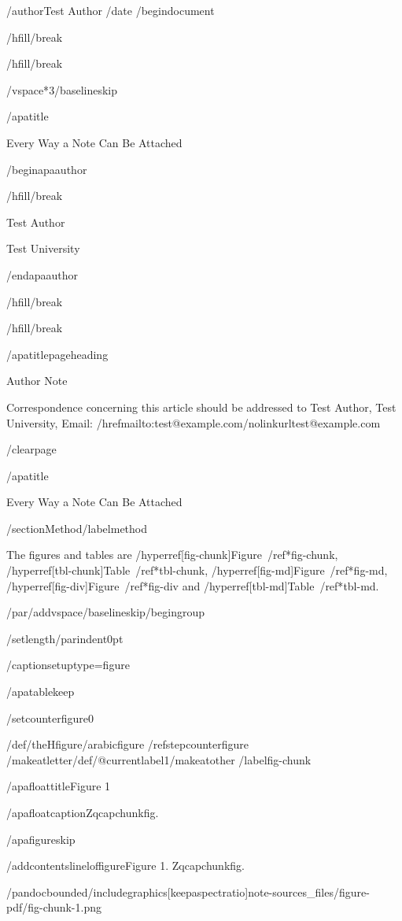 /author{Test Author}
/date{}
/begin{document}


/hfill/break

/hfill/break

/vspace*{3/baselineskip}

/apatitle{

Every Way a Note Can Be Attached

}

/begin{apaauthor}

/hfill/break

Test Author

Test University

/end{apaauthor}

/hfill/break

/hfill/break

/apatitlepageheading{

Author Note

}

Correspondence concerning this article should be addressed to Test
Author, Test University, Email:
/href{mailto:test@example.com}{/nolinkurl{test@example.com}}

/clearpage

/apatitle{

Every Way a Note Can Be Attached

}

/section{Method}/label{method}

The figures and tables are
/hyperref[fig-chunk]{Figure~/ref*{fig-chunk}},
/hyperref[tbl-chunk]{Table~/ref*{tbl-chunk}},
/hyperref[fig-md]{Figure~/ref*{fig-md}},
/hyperref[fig-div]{Figure~/ref*{fig-div}} and
/hyperref[tbl-md]{Table~/ref*{tbl-md}}.

/par/addvspace{/baselineskip}/begingroup

/setlength{/parindent}{0pt}

/captionsetup{type=figure}

/apatablekeep

/setcounter{figure}{0}

/def/theHfigure{/arabic{figure}}%
/refstepcounter{figure}%
/makeatletter/def/@currentlabel{1}/makeatother%
/label{fig-chunk}

/apafloattitle{Figure 1}

/apafloatcaption{Zqcapchunkfig.}

/apafigureskip

/addcontentsline{lof}{figure}{Figure 1. Zqcapchunkfig.}

/pandocbounded{/includegraphics[keepaspectratio]{note-sources_files/figure-pdf/fig-chunk-1.png}}

